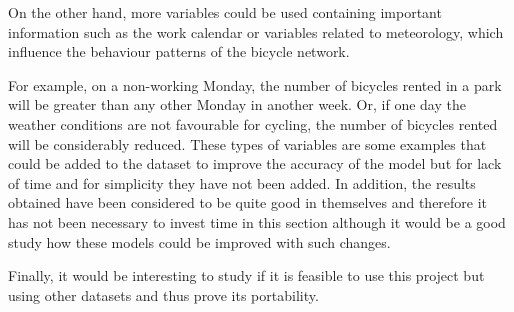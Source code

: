 On the other hand, more variables could be used containing important information such as the work calendar or variables related to meteorology, which influence the behaviour patterns of the bicycle network.
\newline

For example, on a non-working Monday, the number of bicycles rented in a park will be greater than any other Monday in another week. Or, if one day the weather conditions are not favourable for cycling, the number of bicycles rented will be considerably reduced. These types of variables are some examples that could be added to the dataset to improve the accuracy of the model but for lack of time and for simplicity they have not been added. In addition, the results obtained have been considered to be quite good in themselves and therefore it has not been necessary to invest time in this section although it would be a good study how these models could be improved with such changes.
\newline


Finally, it would be interesting to study if it is feasible to use this project but using other datasets and thus prove its portability.
\newline


